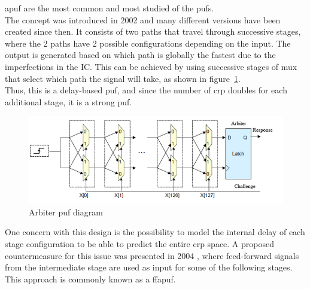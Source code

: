 \acrfull{apuf} are the most common and most studied of the \acrshort{puf}s.\\
The concept was introduced in 2002 \cite{gassend_silicon_2002} and many different versions have been created since then. It consists of two paths that travel through successive stages, where the 2 paths have 2 possible configurations depending on the input. The output is generated based on which path is globally the fastest due to the imperfections in the IC. This can be achieved by using successive stages of \acrfull{mux} that select which path the signal will take, as shown in figure~\ref{fig:APUF}.\\
Thus, this is a delay-based \acrshort{puf}, and since the number of \acrshort{crp} doubles for each additional stage, it is a strong \acrshort{puf}.

\begin{figure}[H]
    \centering
    \includegraphics[width=0.75\linewidth]{images/APUF_diagram.png}
    \caption{Arbiter \acrshort{puf} diagram \cite{anandakumar_fpga-based_2021}}
    \label{fig:APUF}
\end{figure}

One concern with this design is the possibility to model the internal delay of each stage configuration to be able to predict the entire \acrshort{crp} space. A proposed countermeasure for this issue was presented in 2004 \cite{lee_technique_2004}, where feed-forward signals from the intermediate stage are used as input for some of the following stages. This approach is commonly known as a \acrfull{ffapuf}.\\

